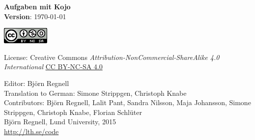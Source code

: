 { \vspace{250mm}\fontsize{11}{11}\flushleft\selectfont 
\vspace*{\fill}

\begin{center}
\Huge {\bf Aufgaben mit Kojo}\\
\Large {\bf Version}: \today{ }
\end{center}
\vskip7cm

\large
\includegraphics{../img/cc.png}

License: Creative Commons {\it Attribution-NonCommercial-ShareAlike 4.0 International} 
\href{http://creativecommons.org/licenses/by-nc-sa/4.0/}{CC BY-NC-SA 4.0}

Editor: Björn Regnell\\
Translation to German: Simone Strippgen, Christoph Knabe\\
Contributors: Björn Regnell, Lalit Pant, Sandra Nilsson, Maja Johansson, Simone Strippgen, Christoph Knabe, Florian Schlüter\\
\textcopyright{ }Björn Regnell, Lund University, 2015 \\
\url{http://lth.se/code}
}
